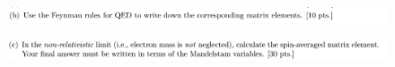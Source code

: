 \documentclass[11pt]{article}
\theoremstyle{definition}
\numberwithin{equation}{section}
\begin{document}
\newpage



\begin{figure}[H]
    \centering
    \includegraphics[scale = 0.4]{2b.png}
\end{figure}

\newpage




\begin{figure}[H]
    \centering
    \includegraphics[scale = 0.4]{2c.png}
\end{figure}

\end{document}
